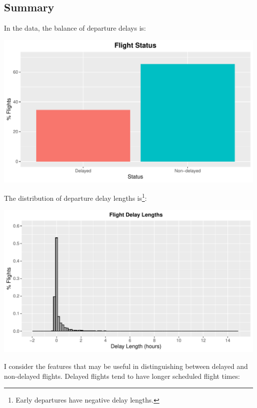 \documentclass[
]{article}
\begin{document}
\subsection{Summary}

In the data, the balance of departure delays is:

\begin{center}\includegraphics{Visualisation_Analysis_files/figure-latex/delay_plt-1} \end{center}

\newpage

The distribution of departure delay lengths
is\footnote{Early departures have negative delay lengths.}:

\begin{center}\includegraphics{Visualisation_Analysis_files/figure-latex/length_plt-1} \end{center}

I consider the features that may be useful in distinguishing between
delayed and non-delayed flights. Delayed flights tend to have longer
scheduled flight times:
\end{document}
